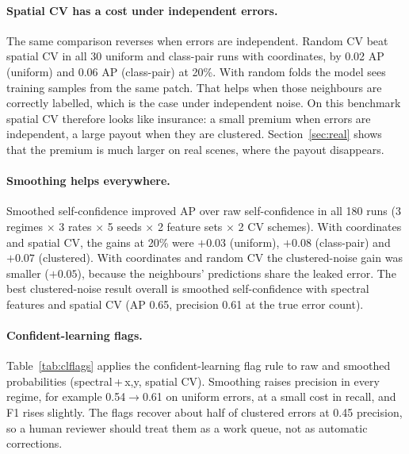 \documentclass[11pt]{article}
\begin{document}
\paragraph{Spatial CV has a cost under independent errors.}
The same comparison reverses when errors are independent. Random CV beat spatial
CV in all 30 uniform and class-pair runs with coordinates, by 0.02 AP (uniform)
and 0.06 AP (class-pair) at 20\%. With random folds the model sees training
samples from the same patch. That helps when those neighbours are correctly
labelled, which is the case under independent noise. On this benchmark spatial CV
therefore looks like insurance: a small premium when errors are independent, a
large payout when they are clustered. Section~\ref{sec:real} shows that the
premium is much larger on real scenes, where the payout disappears.

\paragraph{Smoothing helps everywhere.}
Smoothed self-confidence improved AP over raw self-confidence in all 180 runs
(3 regimes $\times$ 3 rates $\times$ 5 seeds $\times$ 2 feature sets $\times$ 2 CV
schemes). With coordinates and spatial CV, the gains at 20\% were $+0.03$
(uniform), $+0.08$ (class-pair) and $+0.07$ (clustered). With coordinates and
random CV the clustered-noise gain was smaller ($+0.05$), because the
neighbours' predictions share the leaked error. The best clustered-noise result overall is
smoothed self-confidence with spectral features and spatial CV (AP 0.65,
precision 0.61 at the true error count).

\paragraph{Confident-learning flags.}
Table~\ref{tab:clflags} applies the confident-learning flag rule to raw and
smoothed probabilities (spectral\,+\,x,y, spatial CV). Smoothing raises precision
in every regime, for example 0.54$\to$0.61 on uniform errors, at a small cost in
recall, and F1 rises slightly. The flags recover about half of clustered errors at
0.45 precision, so a human reviewer should treat them as a work queue, not as
automatic corrections.

\begin{table}[t]
\centering\small
\caption{Confident-learning flags: precision / recall / F1 at a 20\% error rate
(spectral\,+\,x,y, spatial CV, mean over 5 seeds).}
\label{tab:clflags}

\end{table}
\end{document}
